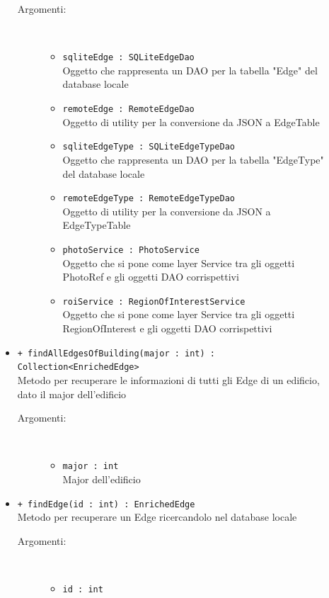 \documentclass[../DefinizioneDiProdotto.tex]{subfiles}
\begin{document}
\begin{description}
\begin{itemize}
\begin{description}
\item[Argomenti:] \
\begin{itemize}
\item \texttt{sqliteEdge : SQLiteEdgeDao}\\
Oggetto che rappresenta un DAO per la tabella "Edge" del database locale\item \texttt{remoteEdge : RemoteEdgeDao}\\
Oggetto di utility per la conversione da JSON a EdgeTable\item \texttt{sqliteEdgeType : SQLiteEdgeTypeDao}\\
Oggetto che rappresenta un DAO per la tabella "EdgeType" del database locale\item \texttt{remoteEdgeType : RemoteEdgeTypeDao}\\
Oggetto di utility per la conversione da JSON a EdgeTypeTable\item \texttt{photoService : PhotoService}\\
Oggetto che si pone come layer Service tra gli oggetti PhotoRef e gli oggetti DAO corrispettivi\item \texttt{roiService : RegionOfInterestService}\\
Oggetto che si pone come layer Service tra gli oggetti RegionOfInterest e gli oggetti DAO corrispettivi\end{itemize}
\end{description}
\item \texttt{+ findAllEdgesOfBuilding(major : int) : Collection<EnrichedEdge>}\\
Metodo per recuperare le informazioni di tutti gli Edge di un edificio, dato il major dell'edificio
 \begin{description}
\item[Argomenti:] \
\begin{itemize}
\item \texttt{major : int}\\
Major dell'edificio\end{itemize}
\end{description}
\item \texttt{+ findEdge(id : int) : EnrichedEdge}\\
Metodo per recuperare un Edge ricercandolo nel database locale
 \begin{description}
\item[Argomenti:] \
\begin{itemize}
\item \texttt{id : int}\\

\end{itemize}
\end{description}
\end{itemize}
\end{description}
\end{document}
